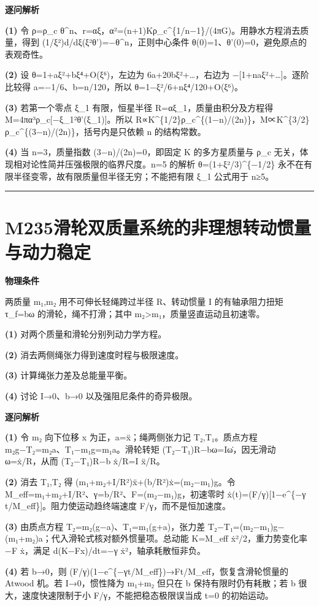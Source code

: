 \documentclass[UTF8,a4paper,11pt,oneside,openany]{ctexbook}
\begin{document}
\par\medskip\noindent\textbf{逐问解析}
\par\noindent\textbf{(1)} 令 ρ=ρ\_c θ\textasciicircum{}n、r=αξ，α²=(n+1)Kρ\_c\textasciicircum{}\{1/n−1\}/(4πG)。用静水方程消去质量，得到 (1/ξ²)d/dξ(ξ²θ')=−θ\textasciicircum{}n，正则中心条件 θ(0)=1、θ'(0)=0，避免原点的表观奇性。
\par\noindent\textbf{(2)} 设 θ=1+aξ²+bξ⁴+O(ξ⁶)，左边为 6a+20bξ²+…，右边为 −[1+naξ²+…]。逐阶比较得 a=−1/6、b=n/120，所以 θ=1−ξ²/6+nξ⁴/120+O(ξ⁶)。
\par\noindent\textbf{(3)} 若第一个零点 ξ\_1 有限，恒星半径 R=αξ\_1，质量由积分及方程得 M=4πα³ρ\_c[−ξ\_1²θ'(ξ\_1)]。所以 R∝K\textasciicircum{}\{1/2\}ρ\_c\textasciicircum{}\{(1−n)/(2n)\}，M∝K\textasciicircum{}\{3/2\}ρ\_c\textasciicircum{}\{(3−n)/(2n)\}，括号内是只依赖 n 的结构常数。
\par\noindent\textbf{(4)} 当 n=3，质量指数 (3−n)/(2n)=0，即固定 K 的多方星质量与 ρ\_c 无关，体现相对论性简并压强极限的临界尺度。n=5 的解析 θ=(1+ξ²/3)\textasciicircum{}\{−1/2\} 永不在有限半径变零，故有限质量但半径无穷；不能把有限 ξ\_1 公式用于 n≥5。

\par\bigskip\hrule\bigskip
\section*{M235\quad 滑轮双质量系统的非理想转动惯量与动力稳定}
\textbf{物理条件}\par 两质量 m₁,m₂ 用不可伸长轻绳跨过半径 R、转动惯量 I 的有轴承阻力扭矩 τ\_f=bω 的滑轮，绳不打滑；其中 m₂>m₁，质量竖直运动且初速零。
\par\noindent\textbf{(1)} 对两个质量和滑轮分别列动力学方程。
\par\noindent\textbf{(2)} 消去两侧绳张力得到速度时程与极限速度。
\par\noindent\textbf{(3)} 计算绳张力差及总能量平衡。
\par\noindent\textbf{(4)} 讨论 I→0、b→0 以及强阻尼条件的奇异极限。

\par\medskip\noindent\textbf{逐问解析}
\par\noindent\textbf{(1)} 令 m₂ 向下位移 x 为正，a=ẍ；绳两侧张力记 T₂,T₁。质点方程 m₂g−T₂=m₂a、T₁−m₁g=m₁a。滑轮转矩 (T₂−T₁)R−bω=Iω̇，因无滑动 ω=ẋ/R，从而 (T₂−T₁)R−b ẋ/R=I ẍ/R。
\par\noindent\textbf{(2)} 消去 T₁,T₂ 得 (m₁+m₂+I/R²)ẍ+(b/R²)ẋ=(m₂−m₁)g。令 M\_eff=m₁+m₂+I/R²、γ=b/R²、F=(m₂−m₁)g，初速零时 ẋ(t)=(F/γ)[1−e\textasciicircum{}\{−γ t/M\_eff\}]。阻力使运动趋终端速度 F/γ，而不是恒加速度。
\par\noindent\textbf{(3)} 由质点方程 T₂=m₂(g−a)、T₁=m₁(g+a)，张力差 T₂−T₁=(m₂−m₁)g−(m₁+m₂)a；代入滑轮式核对额外惯量项。总动能 K=M\_eff ẋ²/2，重力势变化率 −F ẋ，满足 d(K−Fx)/dt=−γ ẋ²，轴承耗散恒非负。
\par\noindent\textbf{(4)} 若 b→0，则 (F/γ)(1−e\textasciicircum{}\{−γt/M\_eff\})→Ft/M\_eff，恢复含滑轮惯量的 Atwood 机。若 I→0，惯性降为 m₁+m₂ 但只在 b 保持有限时仍有耗散；若 b 很大，速度快速限制于小 F/γ，不能把稳态极限误当成 t=0 的初始运动。
\end{document}
